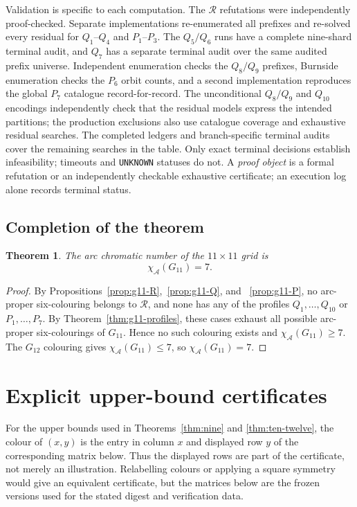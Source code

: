 \documentclass[11pt]{article}
\newtheorem{theorem}{Theorem}
\theoremstyle{definition}
\theoremstyle{remark}
\renewcommand{\ge}{\geqslant}
\renewcommand{\le}{\leqslant}
\begin{document}
Validation is specific to each computation.  The \(\mathcal R\) refutations
were independently proof-checked.  Separate implementations re-enumerated
all prefixes and re-solved every residual for \(Q_1\)--\(Q_4\) and
\(P_1\)--\(P_3\).  The \(Q_5/Q_6\) runs have a complete nine-shard
terminal audit, and \(Q_7\) has a separate terminal audit over the same
audited prefix universe.  Independent enumeration checks the
\(Q_8/Q_9\) prefixes, Burnside enumeration checks the \(P_6\) orbit
counts, and a second implementation reproduces the global \(P_7\)
catalogue record-for-record.  The unconditional \(Q_8/Q_9\) and
\(Q_{10}\) encodings independently check that the residual models express
the intended partitions; the production exclusions also use catalogue
coverage and exhaustive residual searches.  The completed ledgers and
branch-specific terminal audits cover the remaining searches in the table.
Only exact terminal decisions establish infeasibility; timeouts and
\texttt{UNKNOWN} statuses do not.  A \emph{proof object} is a formal
refutation or an independently checkable exhaustive certificate; an
execution log alone records terminal status.

\subsection{Completion of the theorem}

\begin{theorem}\label{thm:k11}
The arc chromatic number of the \(11\times11\) grid is
\[
  \chi_{\mathcal{A}}(G_{11})=7.
\]
\end{theorem}
\begin{proof}
By Propositions~\ref{prop:g11-R},~\ref{prop:g11-Q}, and
~\ref{prop:g11-P}, no arc-proper six-colouring belongs to \(\mathcal R\), and
none has any of the profiles \(Q_1,\ldots,Q_{10}\) or
\(P_1,\ldots,P_7\).  By Theorem~\ref{thm:g11-profiles}, these cases exhaust
all possible arc-proper six-colourings of \(G_{11}\).  Hence no such
colouring exists and \(\chi_{\mathcal{A}}(G_{11})\ge7\).  The \(G_{12}\) colouring gives
\(\chi_{\mathcal{A}}(G_{11})\le7\), so \(\chi_{\mathcal{A}}(G_{11})=7\).
\end{proof}

\section{Explicit upper-bound certificates}
\label{sec:upper-witnesses}

For the upper bounds used in Theorems~\ref{thm:nine} and
\ref{thm:ten-twelve}, the colour of \((x,y)\) is the entry in column
\(x\) and displayed row \(y\) of the corresponding matrix below.
Thus the displayed rows are part of the certificate, not merely an
illustration.  Relabelling colours or applying a square symmetry would give
an equivalent certificate, but the matrices below are the frozen versions
used for the stated digest and verification data.
\end{document}
